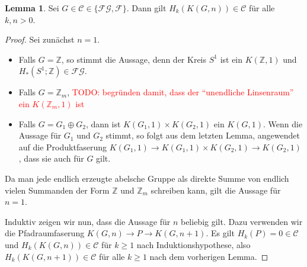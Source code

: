 \documentclass[11pt, a4paper, german]{article}
\theoremstyle{definition}
\newtheorem{lem}{Lemma}
\theoremstyle{remark}
\newcommand{\TODO}[1]{\textcolor{red}{TODO: #1}} %
\newcommand{\Z}{\mathbb{Z}} %
\newcommand{\SC}{\mathcal{C}} %
\newcommand{\FG}{\mathcal{FG}} %
\newcommand{\F}{\mathcal{F}} %
\begin{document}
\begin{lem}\label{homology-kgn-in-c}
  Sei $G \in \SC \in \{ \FG, \F \}$.
  Dann gilt $H_k(K(G, n)) \in \SC$ für alle $k, n > 0$.
\end{lem}

\begin{proof}
  Sei zunächst $n=1$.
  \begin{itemize}
    \item Falls $G = \Z$, so stimmt die Aussage, denn der Kreis $S^1$ ist ein $K(\Z, 1)$ und $H_*(S^1; \Z) \in \FG$.
    \item Falls $G = \Z_m$, \TODO{begründen damit, dass der "`unendliche Linsenraum"' ein $K(\Z_m, 1)$ ist}
    \item Falls $G = G_1 \oplus G_2$, dann ist $K(G_1, 1) \times K(G_2, 1)$ ein $K(G, 1)$.
    Wenn die Aussage für $G_1$ und $G_2$ stimmt, so folgt aus dem letzten Lemma, angewendet auf die Produktfaserung $K(G_1, 1) \to K(G_1, 1) \times K(G_2, 1) \to K(G_2, 1)$, dass sie auch für $G$ gilt.
  \end{itemize}
  Da man jede endlich erzeugte abelsche Gruppe als direkte Summe von endlich vielen Summanden der Form $\Z$ und $\Z_m$ schreiben kann, gilt die Aussage für $n=1$.

  Induktiv zeigen wir nun, dass die Aussage für $n$ beliebig gilt.
  Dazu verwenden wir die Pfadraumfaserung $K(G, n) \to P \to K(G, n{+}1)$.
  Es gilt $H_k(P) = 0 \in \SC$ und $H_k(K(G, n)) \in \SC$ für $k \geq 1$ nach Induktionshypothese, also $H_k(K(G, n{+}1)) \in \SC$ für alle $k \geq 1$ nach dem vorherigen Lemma.
\end{proof}
\end{document}
